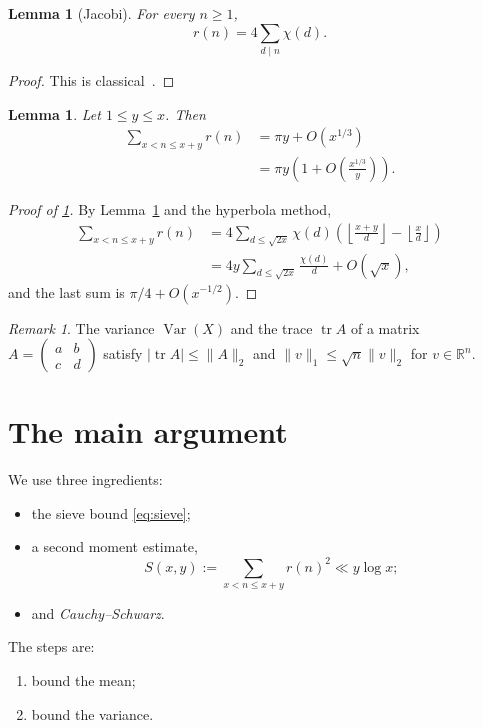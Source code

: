 \documentclass[11pt]{amsart}
\newtheorem{lemma}[theorem]{Lemma}
\theoremstyle{definition}
\theoremstyle{remark}
\newtheorem{remark}[theorem]{Remark}
\numberwithin{equation}{section}
\newcommand{\R}{\mathbb{R}}
\newcommand{\abs}[1]{\left\lvert #1 \right\rvert}
\newcommand{\norm}[2][2]{\lVert #2 \rVert_{#1}}
\DeclareMathOperator{\Var}{Var}
\DeclareMathOperator{\Tr}{tr}
\begin{document}
\begin{lemma}[Jacobi]\label{lem:jacobi}
For every $n \geq 1$,
\[
  r(n) = 4 \sum_{d \mid n} \chi(d).
\]
\end{lemma}

\begin{proof}
This is classical~\cite[\S 16.9]{hardy}.
\end{proof}

\begin{lemma}\label{lem:sieve}
Let $1 \le y \le x$. Then
\begin{align}
  \sum_{x < n \le x + y} r(n) &= \pi y + O(x^{1/3}) \label{eq:sieve} \\
  &= \pi y \left(1 + O\left(\frac{x^{1/3}}{y}\right)\right). \nonumber
\end{align}
\end{lemma}

\begin{proof}[Proof of \cref{lem:sieve}]
By Lemma~\ref{lem:jacobi} and the hyperbola method,
\begin{equation*}
\begin{split}
  \sum_{x < n \le x + y} r(n) &= 4 \sum_{d \le \sqrt{2x}} \chi(d)
      \left(\left\lfloor \frac{x+y}{d} \right\rfloor - \left\lfloor \frac{x}{d} \right\rfloor\right) \\
  &= 4 y \sum_{d \le \sqrt{2x}} \frac{\chi(d)}{d} + O(\sqrt{x}),
\end{split}
\end{equation*}
and the last sum is $\pi/4 + O(x^{-1/2})$.
\end{proof}

\begin{remark}
The variance $\Var(X)$ and the trace $\Tr A$ of a matrix
$A = \begin{pmatrix} a & b \\ c & d \end{pmatrix}$ satisfy $\abs{\Tr A} \le \norm{A}$
and $\norm[1]{v} \le \sqrt{n} \norm{v}$ for $v \in \R^n$.
\end{remark}

\section{The main argument}

We use three ingredients:
\begin{itemize}
  \item the sieve bound \eqref{eq:sieve};
  \item a second moment estimate,
    \begin{equation}
      S(x, y) := \sum_{x < n \le x + y} r(n)^2 \ll y \log x;
    \end{equation}
  \item and \emph{Cauchy--Schwarz}.
\end{itemize}
The steps are:
\begin{enumerate}
  \item bound the mean;
  \item bound the variance.
\end{enumerate}
\end{document}
